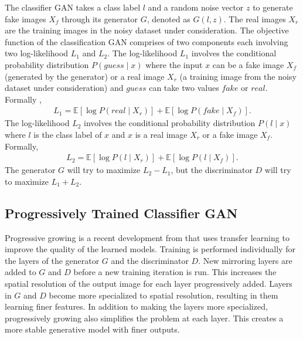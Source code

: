 \documentclass[runningheads]{llncs}
\begin{document}
The classifier GAN \cite{google}  takes a class label $l$ and a random noise vector $z$ to generate   fake images $X_f$ through its generator $G$, denoted as $G(l, z)$. The real images $X_r$  are the training images in the noisy dataset under consideration.  The objective function of the classification GAN comprises of two components each involving two log-likelihood $L_1$ and $L_2$.  The log-likelihood $L_1$  involves   the  conditional probability distribution $P(\mathit{guess} \mid x)$ where  the input $x$ can be a fake image  $X_f$ (generated by the generator) or a real image  $X_r$ (a training image from the noisy dataset under consideration) and $\mathit{guess}$ can take two values $\mathit{fake}$ or $\mathit{real}$.  Formally \cite{google}, 
\begin{equation}
\begin{aligned}
L_1 = \mathbb{E}[\log P(\mathit{real} \mid X_r)] + \mathbb{E}[\log P(\mathit{fake} \mid X_f)].
\end{aligned}
\end{equation}
The log-likelihood $L_2$ involves the conditional probability distribution $P(l \mid x)$  where $l$ is the class label  of $x$ and $x$ is a real image $X_r$ or a fake image $X_f$. Formally, 
\begin{equation}
\begin{aligned}
L_2 = \mathbb{E}[\log P(l \mid X_r)] + \mathbb{E}[\log P(l \mid X_f)].
\end{aligned}
\end{equation}
The generator $G$ will  try to maximize $L_2 - L_1$, but the discriminator $D$ will try to maximize $L_1 + L_2$.


\subsection{Progressively Trained Classifier GAN}\label{prog}

Progressive growing is a recent development from \cite{nvidia2017progressive} that uses transfer learning to improve the quality of the learned models. Training is performed individually for the layers of the generator $G$ and the discriminator $D$. New mirroring layers are added to $G$ and $D$ before a new training iteration is run. This increases the spatial resolution of the output image for each layer progressively added. Layers in $G$ and $D$ become more specialized to  spatial resolution, resulting in them learning finer features. In addition to making the layers more specialized, progressively growing also simplifies the problem at each layer. This creates a more stable generative model with finer outputs. 
\end{document}
